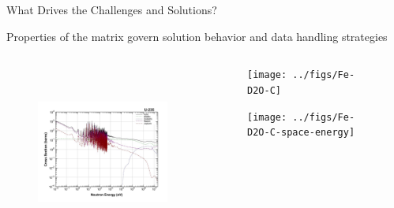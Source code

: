\documentclass[xcolor=x11names,compress]{beamer}
\renewcommand{\(}{\begin{columns}}
\renewcommand{\)}{\end{columns}}
\newcommand{\<}[1]{\begin{column}{#1}}
\renewcommand{\>}{\end{column}}
\begin{document}
\begin{frame}{What Drives the Challenges and Solutions?}
    
    \vspace*{1 em}
    	\textcolor{dgreen}{Properties of the matrix} govern solution behavior and data handling strategies
    	
    \begin{columns}
    \begin{column}{0.55\textwidth}     
 	   \begin{center}
 	   \begin{figure}
 	   \includegraphics[height=2.25in,clip]{../figs/u235-xsecs}
       \end{figure}
 	   \end{center}
  	\end{column}
 	\begin{column}{0.4\textwidth}
 	   \begin{center}
 	   \begin{figure}     
 	   \texttt{[image: ../figs/Fe-D2O-C]}
 	   \end{figure}
 	   \begin{figure} 
 	   \texttt{[image: ../figs/Fe-D2O-C-space-energy]}
       \end{figure}
 	   \end{center}
  	\end{column}
	\end{columns}
	
\end{frame}
\end{document}
